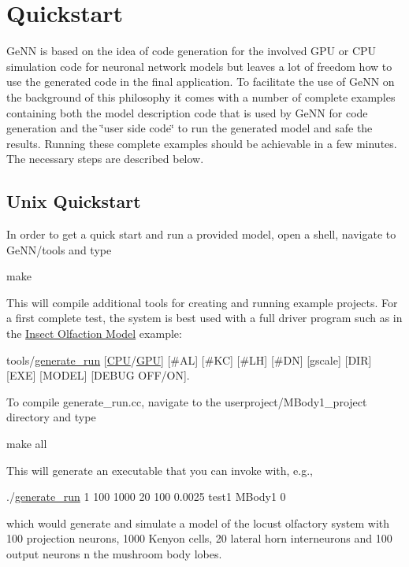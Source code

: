 \hypertarget{Quickstart_page_quick_sec}{}\section{Quickstart}\label{Quickstart_page_quick_sec}
Ge\+N\+N is based on the idea of code generation for the involved G\+P\+U or C\+P\+U simulation code for neuronal network models but leaves a lot of freedom how to use the generated code in the final application. To facilitate the use of Ge\+N\+N on the background of this philosophy it comes with a number of complete examples containing both the model description code that is used by Ge\+N\+N for code generation and the \char`\"{}user side code\char`\"{} to run the generated model and safe the results. Running these complete examples should be achievable in a few minutes. The necessary steps are described below.\hypertarget{Quickstart_page_unix_quick}{}\subsection{Unix Quickstart}\label{Quickstart_page_unix_quick}
In order to get a quick start and run a provided model, open a shell, navigate to {\ttfamily Ge\+N\+N/tools} and type 
\begin{DoxyCode}
make
\end{DoxyCode}
 This will compile additional tools for creating and running example projects. For a first complete test, the system is best used with a full driver program such as in the \hyperlink{Examples_ex_mbody}{Insect Olfaction Model} example\+: 
\begin{DoxyCode}
tools/\hyperlink{userproject_2MBody__userdef__project_2README_8txt_a320a215d1e27b4de394be70e90d22863}{generate\_run} [\hyperlink{README_8txt_a74a069e3c75797de2636c4dd14daa147}{CPU}/\hyperlink{modelSpec_8h_a39cb9803524b6f3b783344b2f89867b4}{GPU}] [#AL] [#KC] [#LH] [#DN] [gscale] [DIR] [EXE] [MODEL] [DEBUG 
      OFF/ON]. 
\end{DoxyCode}
 To compile {\ttfamily generate\+\_\+run.\+cc}, navigate to the {\ttfamily userproject/\+M\+Body1\+\_\+project} directory and type 
\begin{DoxyCode}
make all
\end{DoxyCode}
 This will generate an executable that you can invoke with, e.\+g., 
\begin{DoxyCode}
./\hyperlink{userproject_2MBody__userdef__project_2README_8txt_a320a215d1e27b4de394be70e90d22863}{generate\_run} 1 100 1000 20 100 0.0025 test1 MBody1 0 
\end{DoxyCode}
 which would generate and simulate a model of the locust olfactory system with 100 projection neurons, 1000 Kenyon cells, 20 lateral horn interneurons and 100 output neurons n the mushroom body lobes.

